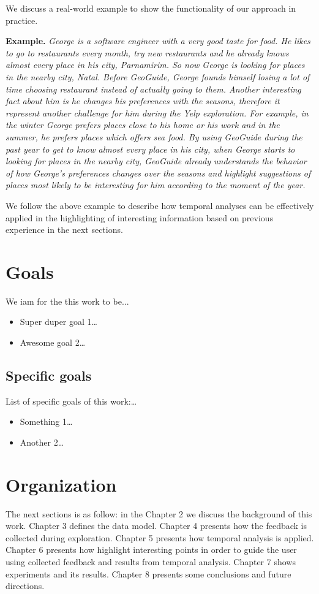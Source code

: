 We discuss a real-world example to show the functionality of our approach in practice.

\textbf{Example.} \textit{George is a software engineer with a very good taste for food.
	He likes to go to restaurants every month, try new restaurants and he
	already knows almost every place in his city, Parnamirim. So now George is looking
	for places in the nearby city, Natal. Before GeoGuide, George founds himself losing
	a lot of time choosing restaurant instead of actually going to them. Another interesting fact about him is he
	changes his preferences with the seasons, therefore it represent another challenge for him during the
	Yelp exploration. For example, in the winter George prefers places close to his
	home or his work and in the summer, he prefers places which offers sea food.
	By using GeoGuide during the past year to get to know almost every place in his city,
	when George starts to looking for places in the nearby city, GeoGuide already
	understands the behavior of how George's preferences changes over the seasons and highlight
	suggestions of places most likely to be interesting for him according to
	the moment of the year.}

We follow the above example to describe how temporal analyses can be effectively
applied in the highlighting of interesting information based on previous experience
in the next sections.

\section{Goals}

We iam for the this work to be...

\begin{itemize}
	\item Super duper goal 1\ldots
	\item Awesome goal 2\ldots
\end{itemize}

\subsection{Specific goals}

List of specific goals of this work:\ldots

\begin{itemize}
	\item Something 1\ldots
	\item Another 2\ldots
\end{itemize}

\section{Organization}

The next sections is as follow: in the Chapter 2 we discuss the background of this work.
Chapter 3 defines the data model.
Chapter 4 presents how the feedback is collected during exploration.
Chapter 5 presents how temporal analysis is applied.
Chapter 6 presents how highlight interesting points in order to guide the user using collected feedback and results from temporal analysis.
Chapter 7 shows experiments and its results.
Chapter 8 presents some conclusions and future directions.
